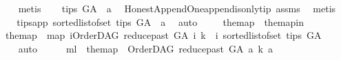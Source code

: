 \begin{isabellebody}
\ \ \ \ \isamarkupfalse%
\ metis\isanewline
\ \ \isamarkupfalse%
\ {\isachardoublequoteopen}{\isacharparenleft}{\kern0pt}tips\ G{\isacharunderscore}{\kern0pt}A{\isacharparenright}{\kern0pt}\ {\isacharequal}{\kern0pt}\ {\isacharbraceleft}{\kern0pt}a{\isacharbraceright}{\kern0pt}{\isachardoublequoteclose}\ \isamarkupfalse%
\ Honest{\isacharunderscore}{\kern0pt}Append{\isacharunderscore}{\kern0pt}One{\isachardot}{\kern0pt}append{\isacharunderscore}{\kern0pt}is{\isacharunderscore}{\kern0pt}only{\isacharunderscore}{\kern0pt}tip\ assms\ \isamarkupfalse%
\ metis\isanewline
\ \ \isamarkupfalse%
\ \isamarkupfalse%
\ tips{\isacharunderscore}{\kern0pt}app{\isacharcolon}{\kern0pt}\ {\isachardoublequoteopen}{\isacharparenleft}{\kern0pt}sorted{\isacharunderscore}{\kern0pt}list{\isacharunderscore}{\kern0pt}of{\isacharunderscore}{\kern0pt}set\ {\isacharparenleft}{\kern0pt}tips\ G{\isacharunderscore}{\kern0pt}A{\isacharparenright}{\kern0pt}{\isacharparenright}{\kern0pt}\ {\isacharequal}{\kern0pt}\ {\isacharbrackleft}{\kern0pt}a{\isacharbrackright}{\kern0pt}{\isachardoublequoteclose}\ \isamarkupfalse%
\ auto\ \isanewline
\ \ \isamarkupfalse%
\ the{\isacharunderscore}{\kern0pt}map\ \ the{\isacharunderscore}{\kern0pt}map{\isacharunderscore}{\kern0pt}in{\isacharcolon}{\kern0pt}\isanewline
\ \ \ {\isachardoublequoteopen}the{\isacharunderscore}{\kern0pt}map\ {\isacharequal}{\kern0pt}\ {\isacharparenleft}{\kern0pt}{\isacharparenleft}{\kern0pt}map\ {\isacharparenleft}{\kern0pt}{\isasymlambda}i{\isachardot}{\kern0pt}{\isacharparenleft}{\kern0pt}{\isacharparenleft}{\kern0pt}{\isacharparenleft}{\kern0pt}OrderDAG\ {\isacharparenleft}{\kern0pt}reduce{\isacharunderscore}{\kern0pt}past\ G{\isacharunderscore}{\kern0pt}A\ i{\isacharparenright}{\kern0pt}\ k{\isacharparenright}{\kern0pt}{\isacharparenright}{\kern0pt}\ {\isacharcomma}{\kern0pt}\ i{\isacharparenright}{\kern0pt}{\isacharparenright}{\kern0pt}\ {\isacharparenleft}{\kern0pt}sorted{\isacharunderscore}{\kern0pt}list{\isacharunderscore}{\kern0pt}of{\isacharunderscore}{\kern0pt}set\ {\isacharparenleft}{\kern0pt}tips\ G{\isacharunderscore}{\kern0pt}A{\isacharparenright}{\kern0pt}{\isacharparenright}{\kern0pt}{\isacharparenright}{\kern0pt}{\isacharparenright}{\kern0pt}{\isachardoublequoteclose}\isanewline
\ \ \ \ \isamarkupfalse%
\ auto\isanewline
\ \ \isamarkupfalse%
\ \isamarkupfalse%
\ m{\isacharunderscore}{\kern0pt}l{\isacharcolon}{\kern0pt}\ {\isachardoublequoteopen}\ the{\isacharunderscore}{\kern0pt}map\ {\isacharequal}{\kern0pt}\ {\isacharbrackleft}{\kern0pt}{\isacharparenleft}{\kern0pt}{\isacharparenleft}{\kern0pt}OrderDAG\ {\isacharparenleft}{\kern0pt}reduce{\isacharunderscore}{\kern0pt}past\ G{\isacharunderscore}{\kern0pt}A\ a{\isacharparenright}{\kern0pt}\ k{\isacharparenright}{\kern0pt}{\isacharcomma}{\kern0pt}\ a{\isacharparenright}{\kern0pt}{\isacharbrackright}{\kern0pt}{\isachardoublequoteclose}\isanewline

\end{isabellebody}

